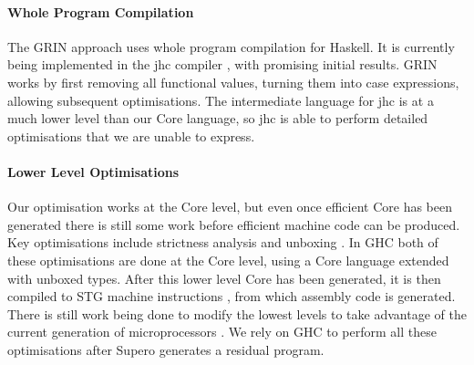\paragraph{Whole Program Compilation} The GRIN approach \cite{grin} uses whole program compilation for Haskell. It is currently being implemented in the jhc compiler \cite{jhc}, with promising initial results. GRIN works by first removing all functional values, turning them into case expressions, allowing subsequent optimisations. The intermediate language for jhc is at a much lower level than our Core language, so jhc is able to perform detailed optimisations that we are unable to express.

\paragraph{Lower Level Optimisations} Our optimisation works at the Core level, but even once efficient Core has been generated there is still some work before efficient machine code can be produced. Key optimisations include strictness analysis and unboxing \cite{spj:unboxing}. In GHC both of these optimisations are done at the Core level, using a Core language extended with unboxed types. After this lower level Core has been generated, it is then compiled to STG machine instructions \cite{spj:stg}, from which assembly code is generated. There is still work being done to modify the lowest levels to take advantage of the current generation of microprocessors \cite{marlow:pointer_tagging}. We rely on GHC to perform all these optimisations after Supero generates a residual program.

\begin{comment}
\paragraph{Other Transformations} One of the central operations within our optimisation in inlining, a technique that has been used extensively within GHC \cite{spj:inlining}. We generalise the constructor specialisation technique \cite{spj:specconstr}, by allowing specialisation on any arbitrary expression, including constructors.

One optimisation we do not currently support is the use of user provided transformation rules \cite{spj:rules}, which can be used to automatically replace certain expressions with others -- for example |sort . nub| removes duplicates then sorts a list, but can be done asymptotically faster in a single operation.
\end{comment}


